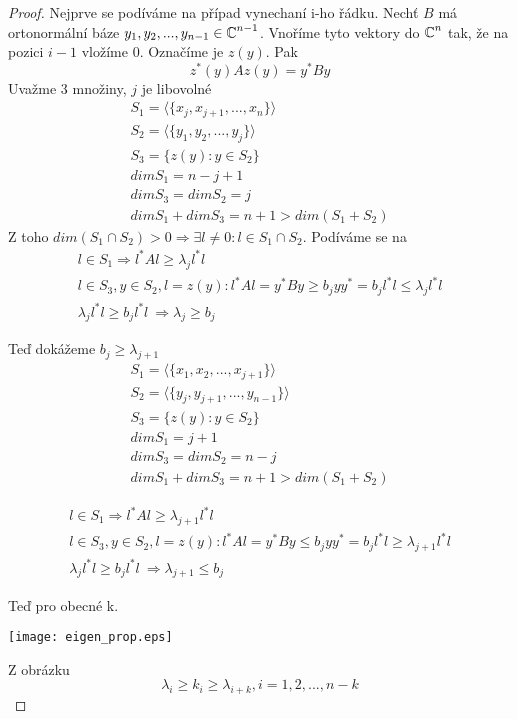 \begin{proof}
	Nejprve se podíváme na případ vynechaní i-ho řádku.
	Nechť $B$ má ortonormální báze $y_1, y_2, ..., y_{n-1} \in \operatorname{\mathbb{C}}^{n - 1}$.
	Vnoříme tyto vektory do $\operatorname{\mathbb{C}}^n$ tak, že na pozici $i - 1$ vložíme 0.
	Označíme je $z(y)$.
	Pak
	\[ z^{\ast}(y)Az(y) = y^{\ast}By \]
	Uvažme 3 množiny, $j$ je libovolné
	\begin{gather*}
		S_1 = \langle\{x_j, x_{j+1},..., x_n\} \rangle \\
		S_2 = \langle\{y_1, y_2,..., y_j\} \rangle \\
		S_3 = \{z(y): y \in S_2 \} \\
		dim S_1 = n - j + 1 \\
		dim S_3 = dim S_2 = j \\
		dim S_1 + dim S_3 = n+1 > dim (S_1 + S_2)
	\end{gather*}
	Z toho $dim(S_1 \cap S_2) > 0 \Rightarrow \exists l \ne 0 : l \in S_1 \cap S_2$.
	Podíváme se na
	\begin{gather*}
		l \in S_1 \Rightarrow l^{\ast}Al \geq \lambda_j l^{\ast}l \\
		l \in S_3, y \in S_2, l = z(y): l^{\ast}Al = y^{\ast}By \geq b_j y y^{\ast} = b_j l^{\ast} l \leq \lambda_j l^{\ast}l \\
		\lambda_j l^{\ast}l \geq b_j l^{\ast}l\ \Rightarrow \lambda_j \geq b_j
	\end{gather*}

	Teď dokážeme $ b_j \geq \lambda_{j + 1} $
	\begin{gather*}
		S_1 = \langle\{x_1, x_2,..., x_{j+1}\} \rangle \\
		S_2 = \langle\{y_j, y_{j+1},..., y_{n-1}\} \rangle \\
		S_3 = \{z(y): y \in S_2 \} \\
		dim S_1 = j + 1 \\
		dim S_3 = dim S_2 = n - j \\
		dim S_1 + dim S_3 = n+1 > dim (S_1 + S_2)
	\end{gather*}

	\begin{gather*}
		l \in S_1 \Rightarrow l^{\ast}Al \geq \lambda_{j + 1} l^{\ast}l \\
		l \in S_3, y \in S_2, l = z(y): l^{\ast}Al = y^{\ast}By \leq b_j y y^{\ast} = b_j l^{\ast} l \geq \lambda_{j + 1} l^{\ast}l \\
		\lambda_j l^{\ast}l \geq b_j l^{\ast}l\ \Rightarrow \lambda_{j + 1} \leq b_j
	\end{gather*}

	Teď pro obecné k.

	\texttt{[image: eigen\_prop.eps]}

	Z obrázku
	\[ \lambda_i \geq k_i \geq \lambda_{i + k}, i = 1,2,..., n-k  \]

\end{proof}

